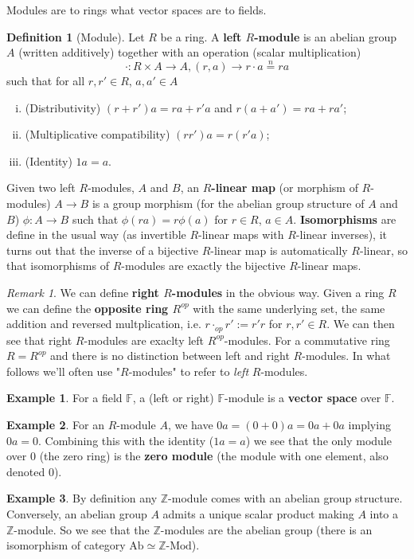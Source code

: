 \documentclass[a4paper,12pt,parskip=half*,chapterprefix=true,numbers=noendperiod]{scrreprt}
\theoremstyle{definition}
\newtheorem{definition}{Definition}[section]
\newtheorem{example}{Example}[section]
\theoremstyle{remark}
\newtheorem*{remark}{Remark}
\begin{document}
Modules are to rings what vector spaces are to fields.

\begin{definition}[Module]
	Let $R$ be a ring. A \textbf{left $R$-module} is an abelian group $A$ (written additively) together with an operation (scalar multiplication)
	\begin{equation*}
		\cdot:R\times A\to A,(r,a)\to r\cdot a\overset{n}{=}ra
	\end{equation*}
	such that for all $r,r'\in R$, $a,a'\in A$
	\begin{enumerate}[(i)]
		\item (Distributivity) $(r+r')a=ra+r'a$ and $r(a+a')=ra+ra'$;
		\item (Multiplicative compatibility) $(rr')a=r(r'a)$;
		\item (Identity) $1a=a$.
	\end{enumerate}
	
	Given two left $R$-modules, $A$ and $B$, an \textbf{$R$-linear map} (or morphism of $R$-modules) $A\to B$ is a group morphism (for the abelian group structure of $A$ and $B$) $\phi:A\to B$ such that $\phi(ra)=r\phi(a)$ for $r\in R$, $a\in A$. \textbf{Isomorphisms} are define in the usual way (as invertible $R$-linear maps with $R$-linear inverses), it turns out that the inverse of a bijective $R$-linear map is automatically $R$-linear, so that isomorphisms of $R$-modules are exactly the bijective $R$-linear maps.
\end{definition}
\begin{remark}
	We can define \textbf{right $R$-modules} in the obvious way. Given a ring $R$ we can define the \textbf{opposite ring $R^{op}$} with the same underlying set, the same addition and reversed multplication, i.e. $r\cdot_{op}r':=r'r$ for $r,r'\in R$. We can then see that right $R$-modules are exaclty left $R^{op}$-modules. For a commutative ring $R=R^{op}$ and there is no distinction between left and right $R$-modules. In what follows we'll often use "$R$-modules" to refer to \emph{left} $R$-modules.
\end{remark}
\begin{example}
	For a field $\mathbb{F}$, a (left or right) $\mathbb{F}$-module is a \textbf{vector space} over $\mathbb{F}$.
\end{example}
\begin{example}
	For an $R$-module $A$, we have $0a=(0+0)a=0a+0a$ implying $0a=0$. Combining this with the identity ($1a=a$) we see that the only module over $0$ (the zero ring) is the \textbf{zero module} (the module with one element, also denoted $0$).
\end{example}
\begin{example}
	By definition any $\mathbb{Z}$-module comes with an abelian group structure. Conversely, an abelian group $A$ admits a unique scalar product making $A$ into a $\mathbb{Z}$-module. So we see that the $\mathbb{Z}$-modules are the abelian group (there is an isomorphism of category $\text{Ab}\simeq\mathbb{Z}\text{-Mod}$).
\end{example}
\end{document}
